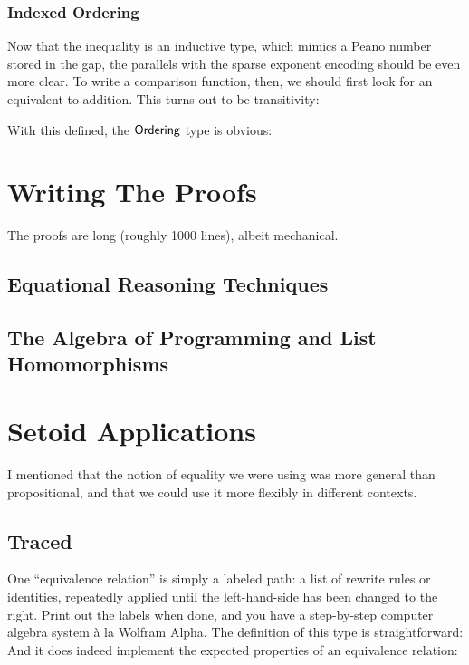 \documentclass[draft, twocolumn]{article}
\theoremstyle{definition}
\begin{document}
\subsubsection{Indexed Ordering}
Now that the inequality is an inductive type, which mimics a Peano number stored
in the gap, the parallels with the sparse exponent encoding should be even more
clear. To write a comparison function, then, we should first look for an
equivalent to addition. This turns out to be transitivity:

With this defined, the \(\AgdaDatatype{Ordering}\) type is obvious:

\section{Writing The Proofs}
The proofs are long (roughly 1000 lines), albeit mechanical.
\subsection{Equational Reasoning Techniques}
\subsection{The Algebra of Programming and List Homomorphisms}
\section{Setoid Applications} \label{setoid-applications}
I mentioned that the notion of equality we were using was more general than
propositional, and that we could use it more flexibly in different contexts.
\subsection{Traced}
One ``equivalence relation'' is simply a labeled path: a list of rewrite rules
or identities, repeatedly applied until the left-hand-side has been changed to
the right. Print out the labels when done, and you have a step-by-step computer
algebra system à la Wolfram Alpha. The definition of this type is
straightforward:
And it does indeed implement the expected properties of an equivalence relation:
\end{document}
